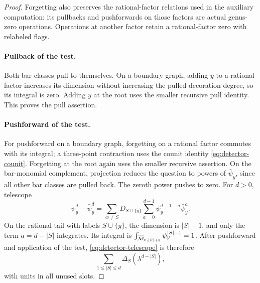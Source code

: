 \begin{proof}
Forgetting also preserves the rational-factor relations used in
the auxiliary computation: its pullbacks and pushforwards on
those factors are actual genus-zero operations.  Operations at
another factor retain a rational-factor zero with relabeled flags.

\paragraph{Pullback of the test.}
Both bar classes
pull to themselves.  On a boundary graph, adding \(y\) to a
rational factor increases its dimension without increasing
the pulled decoration degree, so its integral is zero.
Adding \(y\) at the root uses the smaller recursive pull
identity.  This proves the pull assertion.

\paragraph{Pushforward of the test.}
For pushforward on a boundary graph, forgetting on a rational
factor commutes with its integral; a three-point contraction
uses the counit identity \eqref{eq:detector-counit}.
Forgetting at the root again uses the smaller recursive
assertion.  On the bar-monomial complement, projection reduces
the question to powers of \(\bar\psi_y\), since all other bar
classes are pulled back.  The zeroth power pushes to zero.
For \(d>0\), telescope
\begin{equation}
 \psi_y^d-\bar\psi_y^d
 =
 \sum_{\varnothing\neq S}
 D_{S\cup\{y\}}\sum_{a=0}^{d-1}
        \psi_y^{d-1-a}\bar\psi_y^a.
 \label{eq:detector-telescope}
\end{equation}
On the rational tail with labels \(S\cup\{y\}\), the dimension
is \(|S|-1\), and only the term \(a=d-|S|\) integrates.
Its integral is
\(\int_{\overline{\mathcal M}_{0,|S|+2}}\psi_y^{|S|-1}=1\).
After pushforward and application of the test, \eqref{eq:detector-telescope} is
therefore
\begin{equation}
 \sum_{1\leq |S|\leq d}\Delta_S(\lambda^{d-|S|}),
 \label{eq:detector-tail-sum}
\end{equation}
with units in all unused slots.


\end{proof}

